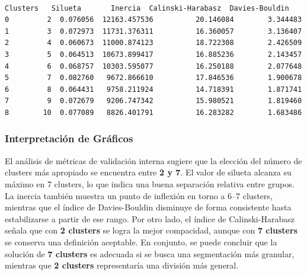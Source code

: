 \documentclass[11pt]{article}
\makeatletter
\newcommand{\boxspacing}{\kern\kvtcb@left@rule\kern\kvtcb@boxsep}
\newcommand{\prompt}[4]{
        {\ttfamily\llap{{\color{#2}[#3]:\hspace{3pt}#4}}\vspace{-\baselineskip}}
    }
\makeatother
\begin{document}
    \begin{center}
    \end{center}
    { \hspace*{\fill} \\}
    
            \begin{tcolorbox}[breakable, size=fbox, boxrule=.5pt, pad at break*=1mm, opacityfill=0]
\prompt{Out}{outcolor}{112}{\boxspacing}
\begin{Verbatim}[commandchars=\\\{\}]
   Clusters   Silueta       Inercia  Calinski-Harabasz  Davies-Bouldin
0         2  0.076056  12163.457536          20.146084        3.344483
1         3  0.072973  11731.376311          16.360057        3.136407
2         4  0.060673  11000.874123          18.722308        2.426509
3         5  0.064513  10673.899417          16.885236        2.143457
4         6  0.068757  10303.595077          16.250188        2.077648
5         7  0.082760   9672.866610          17.846536        1.900678
6         8  0.064431   9758.211924          14.718391        1.871741
7         9  0.072679   9206.747342          15.980521        1.819460
8        10  0.077089   8826.401791          16.283282        1.683486
\end{Verbatim}
\end{tcolorbox}
        
    \hypertarget{interpretaciuxf3n-de-gruxe1ficos}{%
\subsubsection{Interpretación de
Gráficos}\label{interpretaciuxf3n-de-gruxe1ficos}}

    El análisis de métricas de validación interna sugiere que la elección
del número de clusters más apropiado se encuentra entre \textbf{2 y 7}.
El valor de silueta alcanza su máximo en 7 clusters, lo que indica una
buena separación relativa entre grupos. La inercia también muestra un
punto de inflexión en torno a 6--7 clusters, mientras que el índice de
Davies-Bouldin disminuye de forma consistente hasta estabilizarse a
partir de ese rango. Por otro lado, el índice de Calinski-Harabasz
señala que con \textbf{2 clusters} se logra la mejor compacidad, aunque
con \textbf{7 clusters} se conserva una definición aceptable. En
conjunto, se puede concluir que la solución de \textbf{7 clusters} es
adecuada si se busca una segmentación más granular, mientras que
\textbf{2 clusters} representaría una división más general.
\end{document}
